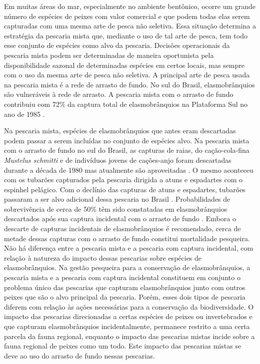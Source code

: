 \documentclass[a4paper,11pt,twoside,showtrims,onecolumn,openright,final]{memoir}
\begin{document}
Em muitas áreas do mar, especialmente no ambiente bentônico, ocorre um grande número de espécies 
de peixes com valor comercial e que podem todas elas serem capturadas com uma mesma arte de pesca 
não seletiva. Essa situação determina a estratégia da pescaria mista que, mediante o uso de tal 
arte de pesca, tem todo esse conjunto de espécies como alvo da pescaria. Decisões operacionais 
da pescaria mista podem ser determinadas de maneira oportunista pela disponibilidade sazonal 
de determinadas espécies em certos locais, mas sempre com o uso da mesma arte de pesca não seletiva. 
A principal arte de pesca usada na pescaria mista é a rede de arrasto de fundo. No sul do Brasil, 
elasmobrânquios são vulneráveis à rede de arrasto. A pescaria mista 
com o arrasto de fundo contribuiu com 72\% da captura total de elasmobrânquios na  Plataforma Sul 
no ano de  1985 \citep{miranda2003}. %

Na pescaria mista, espécies de elasmobrânquios que antes eram descartadas podem passar a 
serem incluídas no conjunto de espécies alvo.  Na pescaria mista com o arrasto de fundo no sul 
do Brasil, as capturas de raias, do cação-cola-fina \emph{Mustelus schmitti} e de indivíduos jovens 
de cações-anjo foram descartadas durante a década de 1980 mas 
atualmente são aproveitadas \citep[Capítulo~\ref{chap:pesca-industrial}]{haimovici1981}. %
O mesmo aconteceu com os tubarões capturados pela pescaria dirigida a atuns e espadartes com o 
espinhel pelágico. Com o declínio das capturas de atuns e espadartes, tubarões passaram a ser alvo 
adicional dessa pescaria no Brasil \citep{amorim1998}. %
Probabilidades de sobrevivência de cerca de 50\% têm sido constatadas em elasmobrânquios descartados 
após sua captura incidental com o arrasto de fundo \citep{laptikhovsky2004}. %
Embora o descarte de capturas incidentais de elasmobrânquios é recomendado, 
cerca de metade dessas capturas com o arrasto de fundo constitui mortalidade pesqueira. 
Não há diferença entre a pescaria mista e 
a pescaria com captura incidental, com relação à natureza do impacto dessas pescarias sobre 
espécies de elasmobrânquios. Na gestão pesqueira para a conservação de elasmobrânquios, 
a pescaria mista e a pescaria com captura incidental constituem em conjunto o problema único das 
pescarias que capturam elasmobrânquios junto com outros peixes que são o alvo principal da pescaria. 
Porém, esses dois tipos de pescaria diferem com relação às ações necessárias para a conservação 
da biodiversidade. O impacto das pescarias direcionadas a certas espécies de peixes ou invertebrados 
e que capturam elasmobrânquios incidentalmente, permanece restrito a uma certa parcela da fauna regional, 
enquanto o impacto das pescarias mistas incide sobre a fauna regional de peixes como um todo. 
Este impacto das pescarias mistas se deve ao uso do arrasto de fundo nessas pescarias.
\end{document}

